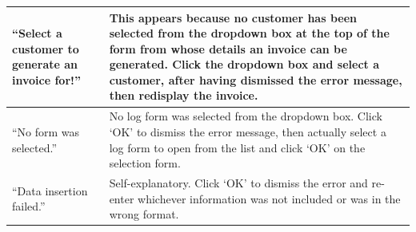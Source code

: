 \begin{longtable} { | p{6cm} | p{6cm} | }
		\hline
		``Select a customer to generate an invoice for!'' & This appears because no customer has been selected from the dropdown box at the top of the form from whose details an invoice can be generated.  Click the dropdown box and select a customer, after having dismissed the error message, then redisplay the invoice.\\
		\hline
		``No form was selected.'' & No log form was selected from the dropdown box.  Click `OK' to dismiss the error message, then actually select a log form to open from the list and click `OK' on the selection form.\\
		\hline
		``Data insertion failed.'' & Self-explanatory.  Click `OK' to dismiss the error and re-enter whichever information was not included or was in the wrong format.\\
		\hline
	\end{longtable}

